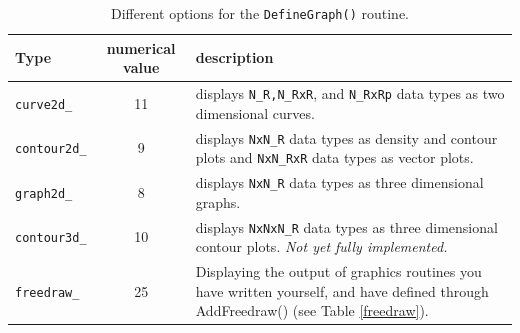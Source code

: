 \documentclass[12pt,letterpaper]{article}
\begin{document}
\begin{table}
\begin{center}
\begin{tabular}{|l|c|p{7cm}|}
\hline
Type  & numerical value & description\\
\hline
\texttt{curve2d\_} & 11  & displays \texttt{N\_R,N\_RxR}, and
                          \texttt{N\_RxRp} data types as two
			  dimensional curves.\\
\texttt{contour2d\_} & 9 & displays \texttt{NxN\_R} data types as
                          density and contour plots and
			  \texttt{NxN\_RxR} data types as vector plots.\\
\texttt{graph2d\_}  & 8  & displays \texttt{NxN\_R} data types as three
                          dimensional graphs.\\ 
\texttt{contour3d\_} & 10& displays \texttt{NxNxN\_R} data types as
                          three dimensional contour plots. \textit{Not
			    yet fully implemented.} \\
\texttt{freedraw\_} & 25 & Displaying the output of graphics routines you have written yourself, and have defined through AddFreedraw() (see Table \ref{freedraw}).\\                          
\hline
\end{tabular}
\end{center}
\label{graphtable}
\caption{Different options for the \texttt{DefineGraph()} routine.}
\end{table}
\end{document}
